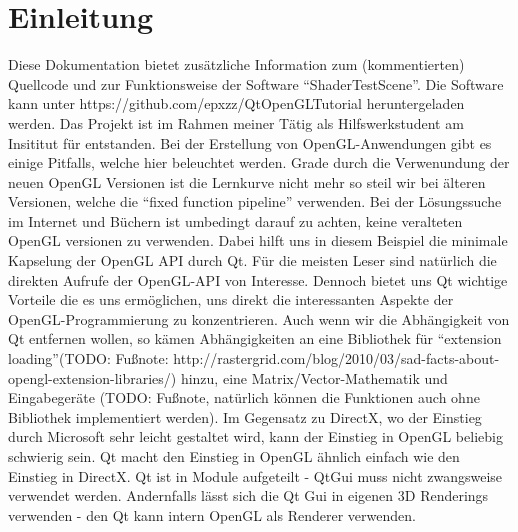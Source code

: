 \documentclass[a4paper,12pt]{article}
\begin{document}



\section{Einleitung}
Diese Dokumentation bietet zusätzliche Information zum (kommentierten) Quellcode und zur Funktionsweise der Software "`ShaderTestScene"'.
Die Software kann unter https://github.com/epxzz/QtOpenGLTutorial heruntergeladen werden.
Das Projekt ist im Rahmen meiner Tätig als Hilfswerkstudent am Insititut für entstanden.
Bei der Erstellung von OpenGL-Anwendungen gibt es einige Pitfalls, welche hier beleuchtet werden. Grade durch die Verwenundung der neuen OpenGL Versionen ist die Lernkurve nicht mehr so steil wir bei älteren Versionen, welche die "`fixed function pipeline"' verwenden. Bei der Lösungssuche im Internet und Büchern ist umbedingt darauf zu achten, keine veralteten OpenGL versionen zu verwenden. Dabei hilft uns in diesem Beispiel die minimale Kapselung der OpenGL API durch Qt.
Für die meisten Leser sind natürlich die direkten Aufrufe der OpenGL-API von Interesse. Dennoch bietet uns Qt wichtige Vorteile die es uns ermöglichen, uns direkt die interessanten Aspekte der OpenGL-Programmierung zu konzentrieren. Auch wenn wir die Abhängigkeit von Qt entfernen wollen, so kämen Abhängigkeiten an eine Bibliothek für "`extension loading"'(TODO: Fußnote: http://rastergrid.com/blog/2010/03/sad-facts-about-opengl-extension-libraries/) hinzu, eine Matrix/Vector-Mathematik und Eingabegeräte (TODO: Fußnote, natürlich können die Funktionen auch ohne Bibliothek implementiert werden). Im Gegensatz zu DirectX, wo der Einstieg durch Microsoft sehr leicht gestaltet wird, kann der Einstieg in OpenGL beliebig schwierig sein.
Qt macht den Einstieg in OpenGL ähnlich einfach wie den Einstieg in DirectX. Qt ist in Module aufgeteilt - QtGui muss nicht zwangsweise verwendet werden. Andernfalls lässt sich die Qt Gui in eigenen 3D Renderings verwenden - den Qt kann intern OpenGL als Renderer verwenden.
\end{document}
